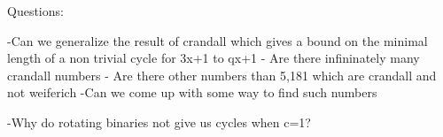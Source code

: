 Questions:

-Can we generalize the result of crandall which gives a bound on the minimal length of a non trivial cycle for 3x+1 to qx+1
- Are there infininately many crandall numbers
- Are there other numbers than 5,181 which are crandall and not weiferich
-Can we come up with some way to find such numbers

-Why do rotating binaries not give us cycles when c=1?
